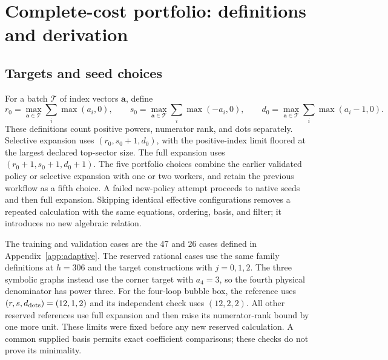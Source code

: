 \section{Complete-cost portfolio: definitions and derivation}
\label{app:portfolio}
\subsection{Targets and seed choices}
For a batch $\mathcal T$ of index vectors $\mathbf a$, define
\begin{equation}
r_0=\max_{\mathbf a\in\mathcal T}\sum_i\max(a_i,0),\qquad
s_0=\max_{\mathbf a\in\mathcal T}\sum_i\max(-a_i,0),\qquad
d_0=\max_{\mathbf a\in\mathcal T}\sum_i\max(a_i-1,0).
\end{equation}
These definitions count positive powers, numerator rank, and dots separately. Selective expansion uses $(r_0,s_0+1,d_0)$, with the positive-index limit floored at the largest declared top-sector size. The full expansion uses $(r_0+1,s_0+1,d_0+1)$. The five portfolio choices combine the earlier validated policy or selective expansion with one or two workers, and retain the previous workflow as a fifth choice. A failed new-policy attempt proceeds to native seeds and then full expansion. Skipping identical effective configurations removes a repeated calculation with the same equations, ordering, basis, and filter; it introduces no new algebraic relation.

The training and validation cases are the 47 and 26 cases defined in Appendix~\ref{app:adaptive}. The reserved rational cases use the same family definitions at $h=306$ and the target constructions with $j=0,1,2$. The three symbolic graphs instead use the corner target with $a_4=3$, so the fourth physical denominator has power three. For the four-loop bubble box, the reference uses $(r,s,d_{\rm dots})=(12,1,2)$ and its independent check uses $(12,2,2)$. All other reserved references use full expansion and then raise its numerator-rank bound by one more unit. These limits were fixed before any new reserved calculation. A common supplied basis permits exact coefficient comparisons; these checks do not prove its minimality.

